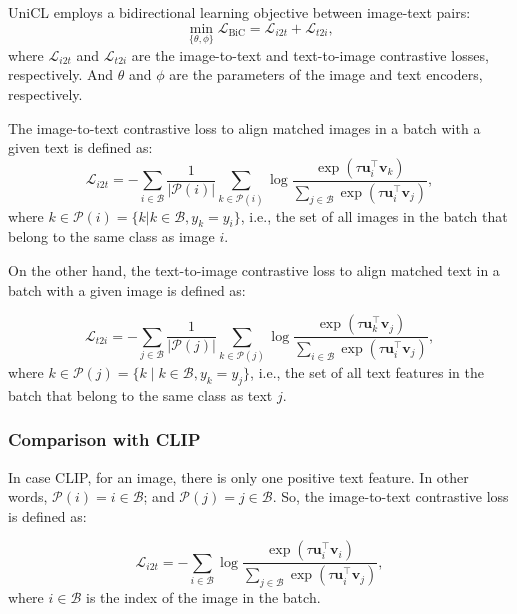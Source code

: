 UniCL employs a bidirectional learning objective between image-text pairs:
\begin{equation} \label{eq:unified_image_text_label_contrast}
    \min_{\{\theta, \phi\}} \mathcal{L}_{\text{BiC}} = \mathcal{L}_{i2t} + \mathcal{L}_{t2i},
\end{equation}
where \(\mathcal{L}_{i2t}\) and \(\mathcal{L}_{t2i}\) are the image-to-text and text-to-image contrastive losses, respectively. And \(\theta\) and \(\phi\) are the parameters of the image and text encoders, respectively.

The image-to-text contrastive loss to align matched images in a batch with a given text is defined as:
\begin{equation} \label{eq:unicl_image_to_text_contrastive_loss}
    \mathcal{L}_{i2t} = - \sum_{i \in \mathcal{B}} \frac{1}{|\mathcal{P}(i)|} \sum_{k \in \mathcal{P}(i)} 
    \log \frac{\exp(\tau \mathbf{u}_i^\top \mathbf{v}_k)}{\sum_{j \in \mathcal{B}} \exp(\tau \mathbf{u}_i^\top \mathbf{v}_j)},
\end{equation}
where $k \in \mathcal{P}(i) = \{k | k \in \mathcal{B}, y_k = y_i\}$, i.e., the set of all images in the batch that belong to the same class as image $i$.

On the other hand, the text-to-image contrastive loss to align matched text in a batch with a given image is defined as:

\begin{equation} \label{eq:unicl_text_to_image_contrastive_loss}
    \mathcal{L}_{t2i} = - \sum_{j \in \mathcal{B}} \frac{1}{|\mathcal{P}(j)|} \sum_{k \in \mathcal{P}(j)} 
    \log \frac{\exp(\tau \mathbf{u}_k^\top \mathbf{v}_j)}{\sum_{i \in \mathcal{B}} \exp(\tau \mathbf{u}_i^\top \mathbf{v}_j)},
\end{equation}
where $k \in \mathcal{P}(j) = \{k \mid k \in \mathcal{B}, y_k = y_j\}$, i.e., the set of all text features in the batch that belong to the same class as text $j$.

\subsubsection{Comparison with CLIP}
\label{subsec:clip_vs_unicl}

In case CLIP, for an image, there is only one positive text feature. In other words, $\mathcal{P}(i) = {i} \in \mathcal{B}$; and $\mathcal{P}(j) = {j} \in \mathcal{B}$. So, the image-to-text contrastive loss is defined as:

\begin{equation} \label{eq:clip_image_to_text_contrastive_loss}
    \mathcal{L}_{i2t} = - \sum_{i \in \mathcal{B}} 
    \log \frac{\exp(\tau \mathbf{u}_i^\top \mathbf{v}_i)}{\sum_{j \in \mathcal{B}} \exp(\tau \mathbf{u}_i^\top \mathbf{v}_j)},
\end{equation}
where $i \in \mathcal{B}$ is the index of the image in the batch.


